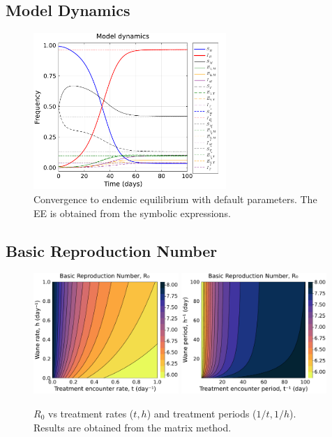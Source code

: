 \documentclass{article}
\begin{document}
\subsection{Model Dynamics}
\begin{figure}[H]
    \centering
    \includegraphics[width=0.65\textwidth]{../../fig/model_dynamics.pdf}
    \caption{Convergence to endemic equilibrium with default parameters. The EE is obtained from the symbolic expressions.}
\end{figure}

\subsection{Basic Reproduction Number}
\begin{figure}[H]
    \centering
    \includegraphics[width=0.49\textwidth]{../../fig/brn_txh_heatmap_m.pdf}
    \includegraphics[width=0.49\textwidth]{../../fig/brn_txh_heatmap_rev_m.pdf}
    \caption{\(R_0\) vs treatment rates (\(t,h\)) and treatment periods (\(1/t,1/h\)). Results are obtained from the matrix method.}
\end{figure}
\end{document}
